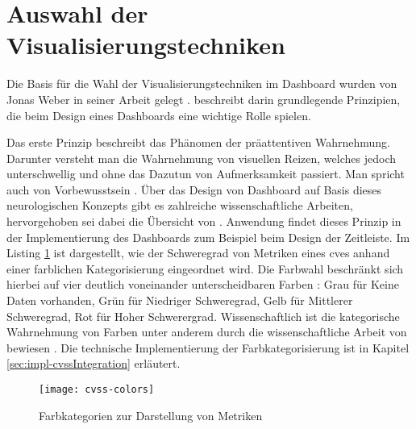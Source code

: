 \section{Auswahl der Visualisierungstechniken}
\label{sec:auswahlDerVisualisierungstechniken}
Die Basis für die Wahl der Visualisierungstechniken im Dashboard wurden von Jonas Weber in seiner Arbeit gelegt \autocite{weberEvaluationDashboardTechniques}. \citeauthor{weberEvaluationDashboardTechniques} beschreibt darin grundlegende Prinzipien, die beim Design eines Dashboards eine wichtige Rolle spielen.
\par Das erste Prinzip beschreibt das Phänomen der präattentiven Wahrnehmung. Darunter versteht man die Wahrnehmung von visuellen Reizen, welches jedoch unterschwellig und ohne das Dazutun von Aufmerksamkeit passiert. Man spricht auch von Vorbewusstsein \autocite{PraeattentiveWahrnehmung,mallotWahrnehmungPraeattentiveIm2021}. Über das Design von Dashboard auf Basis dieses neurologischen Konzepts gibt es zahlreiche wissenschaftliche Arbeiten, hervorgehoben sei dabei die Übersicht von \citeauthor{barrera-leonHowPreattentiveProcess2023} \autocite{barrera-leonHowPreattentiveProcess2023}. Anwendung findet dieses Prinzip in der Implementierung des Dashboards zum Beispiel beim Design der Zeitleiste. Im Listing \ref{fig:cvss-colors} ist dargestellt, wie der Schweregrad von Metriken eines \glspl{cve} anhand einer farblichen Kategorisierung eingeordnet wird. Die Farbwahl beschränkt sich hierbei auf vier deutlich voneinander unterscheidbaren Farben : Grau für Keine Daten vorhanden, Grün für Niedriger Schweregrad, Gelb für Mittlerer Schweregrad, Rot für Hoher Schwerergrad. Wissenschaftlich ist die kategorische Wahrnehmung von Farben unter anderem durch die wissenschaftliche Arbeit von \citeauthor{cliffordColorCategoriesAffect2010} bewiesen \autocite{cliffordColorCategoriesAffect2010}. Die technische Implementierung der Farbkategorisierung ist in Kapitel \ref{sec:impl-cvssIntegration} erläutert.
%
\begin{figure}[H]
    \centering
    \texttt{[image: cvss-colors]}
    \caption{Farbkategorien zur Darstellung von Metriken}
    \label{fig:cvss-colors}
\end{figure}
%
